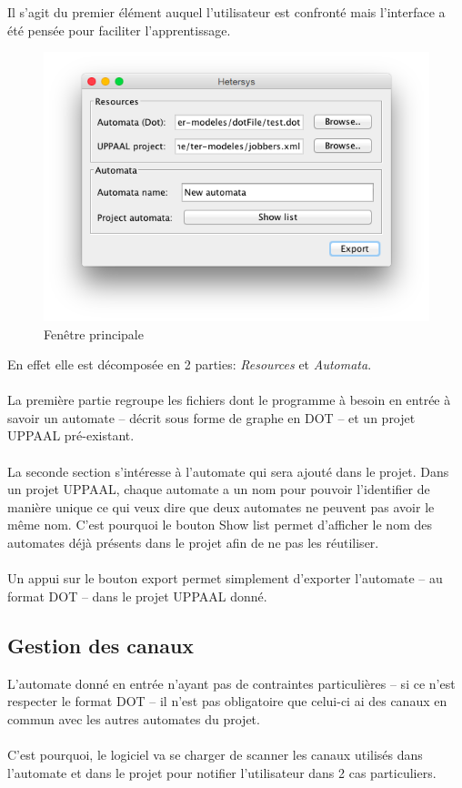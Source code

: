 \documentclass[12pt,a4paper]{report}
\begin{document}
Il s'agit du premier élément auquel l'utilisateur est confronté mais l'interface a été 
pensée pour faciliter l'apprentissage.

\begin{figure}[!h]
  \centering
  \includegraphics[scale=0.6]{ressources/gui/home.png}
  \caption{Fenêtre principale}
\end{figure}

En effet elle est décomposée en 2 parties: \emph{Resources} et \emph{Automata}. 
\\\\
La première partie regroupe les fichiers dont le programme à besoin en entrée à savoir 
un automate -- décrit sous forme de graphe en DOT -- et un projet UPPAAL pré-existant.
\\\\
La seconde section s'intéresse à l'automate qui sera ajouté dans le projet. Dans un projet
UPPAAL, chaque automate a un nom pour pouvoir l'identifier de manière unique ce qui veux 
dire que deux automates ne peuvent pas avoir le même nom. C'est pourquoi le bouton 
\og{}Show list\fg{} permet d'afficher le nom des automates déjà présents dans le projet 
afin de ne pas les réutiliser.
\\\\
Un appui sur le bouton export permet simplement d'exporter l'automate -- au format DOT -- 
dans le projet UPPAAL donné.

\subsection{Gestion des canaux}

L'automate donné en entrée n'ayant pas de contraintes particulières -- si ce n'est respecter 
le format DOT -- il n'est pas obligatoire que celui-ci ai des canaux en commun avec 
les autres automates du projet.
\\\\
C'est pourquoi, le logiciel va se charger de scanner les canaux utilisés dans l'automate 
et dans le projet pour notifier l'utilisateur dans 2 cas particuliers.
\end{document}

